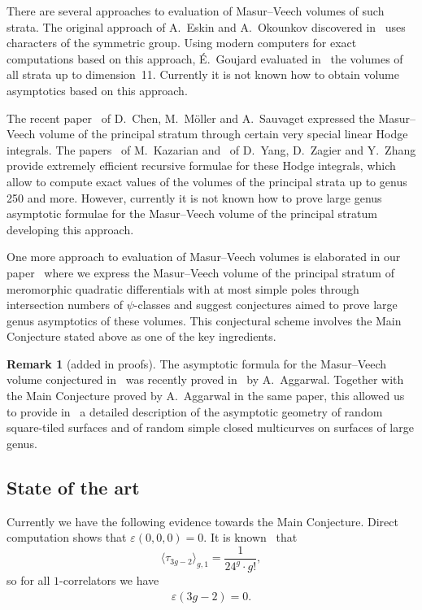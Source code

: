 \documentclass[pdftex]{sigma}
\renewcommand{\epsilon}{\varepsilon}
\theoremstyle{definition}
\newtheorem{Remark}[Theorem]{Remark}
\begin{document}
There are several approaches to evaluation of Masur--Veech
volumes of such strata. The original approach of A.~Eskin
and A.~Okounkov discovered in~\cite{Eskin:Okounkov:pillowcase}
uses
characters of the symmetric group. Using modern computers
for exact computations based on this approach, \'E.~Goujard
evaluated in~\cite{Goujard:volumes} the volumes of all
strata up to dimension~11. Currently it is not known how to
obtain volume asymptotics based on this approach.

The recent paper~\cite{Chen:Moeller:Sauvaget} of D.~Chen,
M.~M\"oller and A.~Sauvaget expressed the Masur--Veech
volume of the principal stratum through certain very
special linear Hodge integrals. The papers~\cite{Kazarian}
of M.~Kazarian and~\cite{Yang:Zagier:Zhang} of D.~Yang,
D.~Zagier and Y.~Zhang provide extremely efficient
recursive formulae for these Hodge integrals, which allow
to compute exact values of the volumes of the principal
strata up to genus 250 and more. However, currently it is
not known how to prove large genus
asymptotic formulae for the Masur--Veech volume
of the principal stratum developing
this approach.

One more approach to evaluation of Masur--Veech volumes is
elaborated in our paper~\cite{DGZZ:volume} where we express
the Masur--Veech volume of the principal stratum of
meromorphic quadratic differentials with at most simple
poles through intersection numbers of $\psi$-classes and
suggest conjectures aimed to prove large genus
asymptotics of these volumes. This conjectural scheme
involves the Main Conjecture stated above as one of the key
ingredients.

\begin{Remark}[added in proofs]\label{rm:Added:in:proofs}
The asymptotic formula for the Masur--Veech volume
conjectured in~\cite{DGZZ:volume} was recently proved
in~\cite{Aggarwal:intersection:numbers} by A.~Aggarwal.
Together with the Main Conjecture proved by
A.~Aggarwal in the same paper, this
allowed us to provide in~\cite{DGZZ:random:multicurves} a
detailed description of the asymptotic geometry of random
square-tiled surfaces and of random simple closed
multicurves on surfaces of large genus.
\end{Remark}

\subsection{State of the art}\label{ss:state:of:the:art}

Currently we have the following evidence towards the Main Conjecture. Direct computation shows that $\epsilon(0,0,0)=0$. It is known~\cite{Witten} that
\[
\langle\tau_{3g-2}\rangle_{g,1}=\frac{1}{24^g\cdot g!} ,
\]
so for all $1$-correlators we have
\begin{gather}\label{eq:epsilon:for:1:correlators}
\epsilon(3g-2)=0 .
\end{gather}
\end{document}
